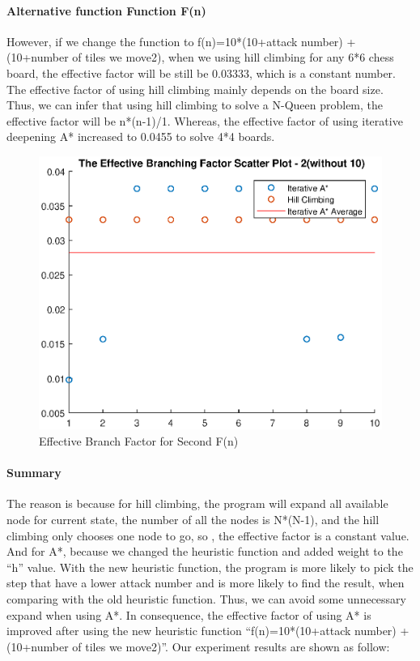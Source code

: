 \documentclass[11pt, a4paper]{article}
\begin{document}
\paragraph{Alternative function Function F(n)}

However, if we change the function to f(n)=10*(10+attack number) + (10+number of tiles we move2), when we using hill climbing for any 6*6 chess board, the effective factor will be still be 0.03333, which is a constant number. The effective factor of using hill climbing mainly depends on the board size. Thus, we can infer that  using hill climbing to solve a N-Queen problem, the effective factor will be n*(n-1)/1. Whereas, the effective factor of using iterative deepening A* increased to 0.0455 to solve 4*4 boards. 

\begin{figure}[htbp]
	\centering 
	\includegraphics[scale=0.4]{ebf_2}
	\caption{Effective Branch Factor for Second F(n)} %
\end{figure}

\paragraph{Summary}
The reason is because for hill climbing, the program will expand all available node for current state, the number of all the nodes is N*(N-1), and the hill climbing only chooses one node to go, so , the effective factor is a constant value. And for A*, because we changed the heuristic function and added weight to the “h” value. With the new heuristic function, the program is more likely to pick the step that have a lower attack number and is more likely to find the result, when comparing with the old heuristic function. Thus, we can avoid some unnecessary expand when using A*. In consequence, the effective factor of using A* is improved after using the new heuristic function “f(n)=10*(10+attack number) + (10+number of tiles we move2)”.
Our experiment results are shown as follow:
\end{document}
